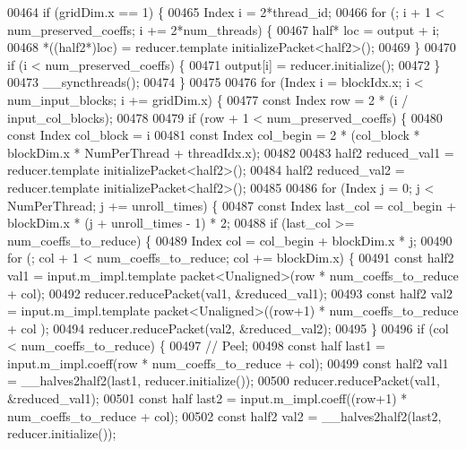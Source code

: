 \begin{DoxyCode}
00464   \textcolor{keywordflow}{if} (gridDim.x == 1) \{
00465     Index i = 2*thread\_id;
00466     \textcolor{keywordflow}{for} (; i + 1 < num\_preserved\_coeffs; i += 2*num\_threads) \{
00467       half* loc = output + i;
00468       *((half2*)loc) = reducer.template initializePacket<half2>();
00469     \}
00470     \textcolor{keywordflow}{if} (i < num\_preserved\_coeffs) \{
00471       output[i] = reducer.initialize();
00472     \}
00473     \_\_syncthreads();
00474   \}
00475 
00476   \textcolor{keywordflow}{for} (Index i = blockIdx.x; i < num\_input\_blocks; i += gridDim.x) \{
00477     \textcolor{keyword}{const} Index row = 2 * (i / input\_col\_blocks);
00478 
00479     \textcolor{keywordflow}{if} (row + 1 < num\_preserved\_coeffs) \{
00480       \textcolor{keyword}{const} Index col\_block = i %
00481       \textcolor{keyword}{const} Index col\_begin = 2 * (col\_block * blockDim.x * NumPerThread + threadIdx.x);
00482 
00483       half2 reduced\_val1 = reducer.template initializePacket<half2>();
00484       half2 reduced\_val2 = reducer.template initializePacket<half2>();
00485 
00486       \textcolor{keywordflow}{for} (Index j = 0; j < NumPerThread; j += unroll\_times) \{
00487         \textcolor{keyword}{const} Index last\_col = col\_begin + blockDim.x * (j + unroll\_times - 1) * 2;
00488         \textcolor{keywordflow}{if} (last\_col >= num\_coeffs\_to\_reduce) \{
00489           Index col = col\_begin + blockDim.x * j;
00490           \textcolor{keywordflow}{for} (; col + 1 < num\_coeffs\_to\_reduce; col += blockDim.x) \{
00491             \textcolor{keyword}{const} half2 val1 = input.m\_impl.template packet<Unaligned>(row * num\_coeffs\_to\_reduce + col);
00492             reducer.reducePacket(val1, &reduced\_val1);
00493             \textcolor{keyword}{const} half2 val2 = input.m\_impl.template packet<Unaligned>((row+1) * num\_coeffs\_to\_reduce + col
      );
00494             reducer.reducePacket(val2, &reduced\_val2);
00495           \}
00496           \textcolor{keywordflow}{if} (col < num\_coeffs\_to\_reduce) \{
00497             \textcolor{comment}{// Peel;}
00498             \textcolor{keyword}{const} half last1 = input.m\_impl.coeff(row * num\_coeffs\_to\_reduce + col);
00499             \textcolor{keyword}{const} half2 val1 = \_\_halves2half2(last1, reducer.initialize());
00500             reducer.reducePacket(val1, &reduced\_val1);
00501             \textcolor{keyword}{const} half last2 = input.m\_impl.coeff((row+1) * num\_coeffs\_to\_reduce + col);
00502             \textcolor{keyword}{const} half2 val2 = \_\_halves2half2(last2, reducer.initialize());

\end{DoxyCode}
